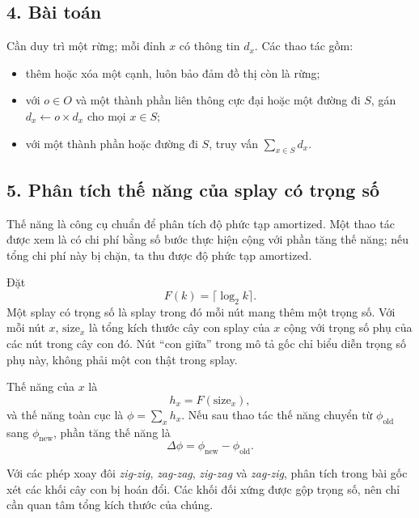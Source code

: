 \documentclass[11pt]{article}
\begin{document}
\subsection*{4. Bài toán}

Cần duy trì một rừng; mỗi đỉnh \(x\) có thông tin \(d_x\). Các thao tác gồm:
\begin{itemize}
  \item thêm hoặc xóa một cạnh, luôn bảo đảm đồ thị còn là rừng;
  \item với \(o\in O\) và một thành phần liên thông cực đại hoặc một đường đi
  \(S\), gán \(d_x\leftarrow o\times d_x\) cho mọi \(x\in S\);
  \item với một thành phần hoặc đường đi \(S\), truy vấn
  \(\sum_{x\in S}d_x\).
\end{itemize}

\subsection*{5. Phân tích thế năng của splay có trọng số}

Thế năng là công cụ chuẩn để phân tích độ phức tạp amortized. Một thao tác
được xem là có chi phí bằng số bước thực hiện cộng với phần tăng thế năng; nếu
tổng chi phí này bị chặn, ta thu được độ phức tạp amortized.

Đặt
\[
  F(k)=\lceil\log_2 k\rceil .
\]
Một splay có trọng số là splay trong đó mỗi nút mang thêm một trọng số. Với
mỗi nút \(x\), \(\mathrm{size}_x\) là tổng kích thước cây con splay của \(x\)
cộng với trọng số phụ của các nút trong cây con đó. Nút ``con giữa'' trong mô
tả gốc chỉ biểu diễn trọng số phụ này, không phải một con thật trong splay.

Thế năng của \(x\) là
\[
  h_x=F(\mathrm{size}_x),
\]
và thế năng toàn cục là \(\phi=\sum_x h_x\). Nếu sau thao tác thế năng chuyển
từ \(\phi_{\mathrm{old}}\) sang \(\phi_{\mathrm{new}}\), phần tăng thế năng là
\[
  \Delta\phi=\phi_{\mathrm{new}}-\phi_{\mathrm{old}}.
\]

Với các phép xoay đôi \emph{zig-zig}, \emph{zag-zag}, \emph{zig-zag} và
\emph{zag-zig}, phân tích trong bài gốc xét các khối cây con bị hoán đổi. Các
khối đối xứng được gộp trọng số, nên chỉ cần quan tâm tổng kích thước của chúng.

\begin{center}
\hfill
{}\\[0.7em]
\hfill
{}
\end{center}
\end{document}
